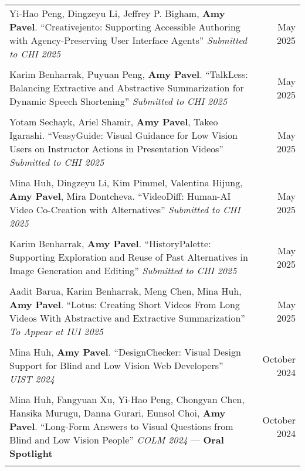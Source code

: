 \begin{longtable}{Xr}
	Yi-Hao Peng, Dingzeyu Li, Jeffrey P. Bigham, \textbf{Amy Pavel}. ``Creativejento: Supporting Accessible Authoring with Agency-Preserving User Interface Agents'' \textit{Submitted to CHI 2025} & May 2025 \\
	\\

	Karim Benharrak, Puyuan Peng, \textbf{Amy Pavel}. ``TalkLess: Balancing Extractive and Abstractive Summarization for Dynamic Speech Shortening'' \textit{Submitted to CHI 2025} & May 2025 \\
	\\

	Yotam Sechayk, Ariel Shamir, \textbf{Amy Pavel}, Takeo Igarashi. ``VeasyGuide: Visual Guidance for Low Vision Users on Instructor Actions in Presentation Videos'' \textit{Submitted to CHI 2025} & May 2025 \\
	\\

	Mina Huh, Dingzeyu Li, Kim Pimmel, Valentina Hijung, \textbf{Amy Pavel}, Mira Dontcheva. ``VideoDiff: Human-AI Video Co-Creation with Alternatives'' \textit{Submitted to CHI 2025} & May 2025 \\
	\\

	Karim Benharrak, \textbf{Amy Pavel}. ``HistoryPalette: Supporting Exploration and Reuse of Past Alternatives in Image Generation and Editing'' \textit{Submitted to CHI 2025} & May 2025 \\
	\\

	Aadit Barua, Karim Benharrak, Meng Chen, Mina Huh, \textbf{Amy Pavel}. ``Lotus: Creating Short Videos From Long Videos With Abstractive and Extractive Summarization'' \textit{To Appear at IUI 2025} & May 2025 \\
	\\

	Mina Huh, \textbf{Amy Pavel}. ``DesignChecker: Visual Design Support for Blind and Low Vision Web Developers'' \textit{UIST 2024} & October 2024 \\
	\\

	Mina Huh, Fangyuan Xu, Yi-Hao Peng, Chongyan Chen, Hansika Murugu, Danna Gurari, Eunsol Choi, \textbf{Amy Pavel}. ``Long-Form Answers to Visual Questions from Blind and Low Vision People'' \textit{COLM 2024} --- \textbf{Oral Spotlight} & October 2024 \\
	\\


\end{longtable}
